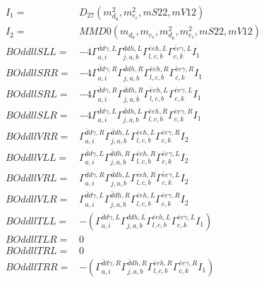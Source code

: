 \documentclass[A4,landscape]{article}
\begin{document}
\begin{align} 
I_1 = & D_{27}(m^2_{d_{{a}}}, m^2_{e_{{c}}}, mS22, mV12) \\ 
I_2 = & MMD0(m_{d_{{a}}}, m_{e_{{c}}}, m^2_{d_{{a}}}, m^2_{e_{{c}}}, mS22, mV12) \\ 
  BOddllSLL= & -4  \Gamma^{\bar{d}d \gamma ,L}_{a, i} \Gamma^{\bar{d}d h ,L}_{j, a, b} \Gamma^{\bar{e}e h ,L}_{l, c, b} \Gamma^{\bar{e}e \gamma ,L}_{c, k} I_1 \\ 
  BOddllSRR= & -4  \Gamma^{\bar{d}d \gamma ,R}_{a, i} \Gamma^{\bar{d}d h ,R}_{j, a, b} \Gamma^{\bar{e}e h ,R}_{l, c, b} \Gamma^{\bar{e}e \gamma ,R}_{c, k} I_1 \\ 
  BOddllSRL= & -4  \Gamma^{\bar{d}d \gamma ,R}_{a, i} \Gamma^{\bar{d}d h ,R}_{j, a, b} \Gamma^{\bar{e}e h ,L}_{l, c, b} \Gamma^{\bar{e}e \gamma ,L}_{c, k} I_1 \\ 
  BOddllSLR= & -4  \Gamma^{\bar{d}d \gamma ,L}_{a, i} \Gamma^{\bar{d}d h ,L}_{j, a, b} \Gamma^{\bar{e}e h ,R}_{l, c, b} \Gamma^{\bar{e}e \gamma ,R}_{c, k} I_1 \\ 
  BOddllVRR= &  \Gamma^{\bar{d}d \gamma ,R}_{a, i} \Gamma^{\bar{d}d h ,L}_{j, a, b} \Gamma^{\bar{e}e h ,L}_{l, c, b} \Gamma^{\bar{e}e \gamma ,R}_{c, k} I_2 \\ 
  BOddllVLL= &  \Gamma^{\bar{d}d \gamma ,L}_{a, i} \Gamma^{\bar{d}d h ,R}_{j, a, b} \Gamma^{\bar{e}e h ,R}_{l, c, b} \Gamma^{\bar{e}e \gamma ,L}_{c, k} I_2 \\ 
  BOddllVRL= &  \Gamma^{\bar{d}d \gamma ,R}_{a, i} \Gamma^{\bar{d}d h ,L}_{j, a, b} \Gamma^{\bar{e}e h ,R}_{l, c, b} \Gamma^{\bar{e}e \gamma ,L}_{c, k} I_2 \\ 
  BOddllVLR= &  \Gamma^{\bar{d}d \gamma ,L}_{a, i} \Gamma^{\bar{d}d h ,R}_{j, a, b} \Gamma^{\bar{e}e h ,L}_{l, c, b} \Gamma^{\bar{e}e \gamma ,R}_{c, k} I_2 \\ 
  BOddllTLL= & -( \Gamma^{\bar{d}d \gamma ,L}_{a, i} \Gamma^{\bar{d}d h ,L}_{j, a, b} \Gamma^{\bar{e}e h ,L}_{l, c, b} \Gamma^{\bar{e}e \gamma ,L}_{c, k} I_1) \\ 
  BOddllTLR= & 0 \\ 
  BOddllTRL= & 0 \\ 
  BOddllTRR= & -( \Gamma^{\bar{d}d \gamma ,R}_{a, i} \Gamma^{\bar{d}d h ,R}_{j, a, b} \Gamma^{\bar{e}e h ,R}_{l, c, b} \Gamma^{\bar{e}e \gamma ,R}_{c, k} I_1) \\ 
\end{align} 
\end{document}
